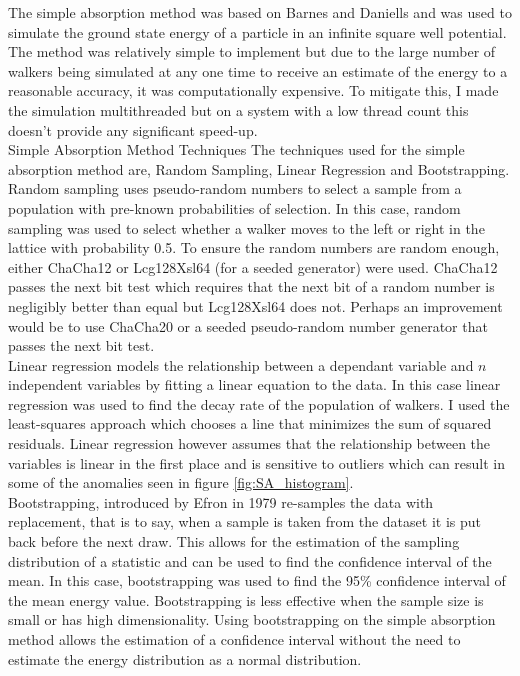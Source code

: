 \documentclass[reqno]{amsart}
\makeatletter
\renewcommand\subsection{\@startsection{subsection}{2}%
  \z@{.5\linespacing\@plus.7\linespacing}{-.5em}%
  {\normalfont\scshape\justify}}
\numberwithin{equation}{section}
\numberwithin{figure}{section}
\makeatother
\begin{document}
The simple absorption method was based on Barnes and Daniells \cite{Barnes1984} and was used to simulate the ground state energy of a particle in an infinite square well potential. The method was relatively simple to implement but due to the large number of walkers being simulated at any one time to receive an estimate of the energy to a reasonable accuracy, it was computationally expensive. To mitigate this, I made the simulation multithreaded but on a system with a low thread count this doesn't provide any significant speed-up. \\

\subsection{Simple Absorption Method Techniques}\label{sec:SA_techniques}
The techniques used for the simple absorption method are, Random Sampling, Linear Regression and Bootstrapping. \\

Random sampling uses pseudo-random numbers to select a sample from a population with pre-known probabilities of selection. In this case, random sampling was used to select whether a walker moves to the left or right in the lattice with probability 0.5. To ensure the random numbers are random enough, either ChaCha12 \cite{Bernstein2008} or Lcg128Xsl64 \cite{Brown1994} (for a seeded generator) were used. ChaCha12 passes the next bit test which requires that the next bit of a random number is negligibly better than equal but Lcg128Xsl64 does not. Perhaps an improvement would be to use ChaCha20 or a seeded pseudo-random number generator that passes the next bit test. \\

Linear regression models the relationship between a dependant variable and $n$ independent variables by fitting a linear equation to the data. In this case linear regression was used to find the decay rate of the population of walkers. I used the least-squares approach which chooses a line that minimizes the sum of squared residuals. Linear regression however assumes that the relationship between the variables is linear in the first place and is sensitive to outliers which can result in some of the anomalies seen in figure \ref{fig:SA_histogram}. \\

Bootstrapping, introduced by Efron in 1979 \cite{Efron1979} re-samples the data with replacement, that is to say, when a sample is taken from the dataset it is put back before the next draw. This allows for the estimation of the sampling distribution of a statistic and can be used to find the confidence interval of the mean. In this case, bootstrapping was used to find the 95\% confidence interval of the mean energy value. Bootstrapping is less effective when the sample size is small or has high dimensionality. Using bootstrapping on the simple absorption method allows the estimation of a confidence interval without the need to estimate the energy distribution as a normal distribution. \\
\end{document}
